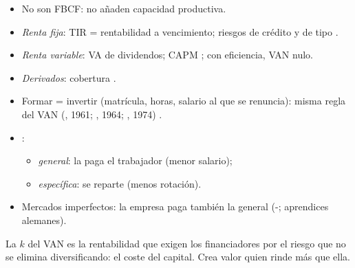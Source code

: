 \documentclass{article}
\begin{document}
\begin{columnas}
\begin{itemize}
\item No son FBCF: no añaden capacidad productiva.
\item \emph{Renta fija}: TIR = rentabilidad a vencimiento; riesgos de crédito y de tipo .
\item \emph{Renta variable}: VA de dividendos; CAPM ; con eficiencia, VAN nulo.
\item \emph{Derivados}: cobertura .
\end{itemize}

\begin{itemize}
\item Formar = invertir (matrícula, horas, salario al que se renuncia): misma regla del VAN (, 1961; , 1964; , 1974) .
\item {}:
  \begin{itemize}
  \item \emph{general}: la paga el trabajador (menor salario);
  \item \emph{específica}: se reparte (menos rotación).
  \end{itemize}
\item Mercados imperfectos: la empresa paga también la general (-; aprendices alemanes).
\end{itemize}

\begin{ideaclave}
La $k$ del VAN es la rentabilidad que exigen los financiadores por el riesgo que no se elimina diversificando: el coste del capital. Crea valor quien rinde más que ella.
\end{ideaclave}


\end{columnas}
\end{document}
